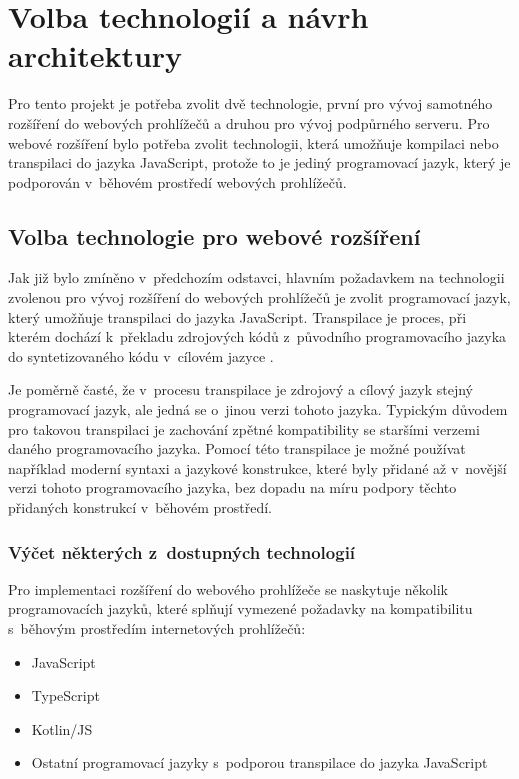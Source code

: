 \chapter{Volba technologií a návrh architektury}

Pro tento projekt je potřeba zvolit dvě technologie, první pro vývoj samotného rozšíření do webových prohlížečů a druhou pro vývoj podpůrného serveru. Pro webové rozšíření bylo potřeba zvolit technologii, která umožňuje kompilaci nebo transpilaci do jazyka JavaScript, protože to je jediný programovací jazyk, který je podporován v~běhovém prostředí webových prohlížečů.

\section{Volba technologie pro webové rozšíření}

Jak již bylo zmíněno v~předchozím odstavci, hlavním požadavkem na technologii zvolenou pro vývoj rozšíření do webových prohlížečů je zvolit programovací jazyk, který umožňuje transpilaci do jazyka JavaScript. Transpilace je proces, při kterém dochází k~překladu zdrojových kódů z~původního programovacího jazyka do syntetizovaného kódu v~cílovém jazyce \cite{fowler_transparent_2013}. 

Je poměrně časté, že v~procesu transpilace je zdrojový a cílový jazyk stejný programovací jazyk, ale jedná se o~jinou verzi tohoto jazyka. Typickým důvodem pro takovou transpilaci je zachování zpětné kompatibility se staršími verzemi daného programovacího jazyka. Pomocí této transpilace je možné používat například moderní syntaxi a jazykové konstrukce, které byly přidané až v~novější verzi tohoto programovacího jazyka, bez dopadu na míru podpory těchto přidaných konstrukcí v~běhovém prostředí.

\subsection{Výčet některých z~dostupných technologií}

Pro implementaci rozšíření do webového prohlížeče se naskytuje několik programovacích jazyků, které splňují vymezené požadavky na kompatibilitu s~běhovým prostředím internetových prohlížečů:

\begin{itemize}
    \item JavaScript
    \item TypeScript
    \item Kotlin/JS
    \item Ostatní programovací jazyky s~podporou transpilace do jazyka JavaScript
\end{itemize}

